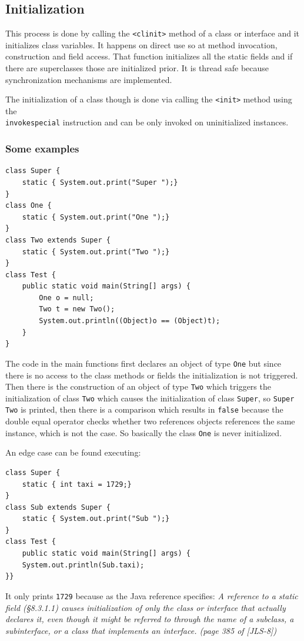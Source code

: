 \subsection{Initialization}
This process is done by calling the \verb|<clinit>| method of a class or interface and it initializes class variables.
It happens on direct use so at method invocation, construction and field access.
That function initializes all the static fields and if there are superclasses those are initialized prior.
It is thread safe because synchronization mechanisms are implemented.

The initialization of a class though is done via calling the \verb|<init>| method using the \\
\verb|invokespecial| instruction and can be only invoked on uninitialized instances.

\subsubsection{Some examples}
\begin{verbatim}
class Super {
    static { System.out.print("Super ");}
}
class One {
    static { System.out.print("One ");}
}
class Two extends Super {
    static { System.out.print("Two ");}
}
class Test {
    public static void main(String[] args) {
        One o = null;
        Two t = new Two();
        System.out.println((Object)o == (Object)t);
    }
}
\end{verbatim}
The code in the main functions first declares an object of type \verb|One| but since there is no access to the class methods or fields the initialization is not triggered.
Then there is the construction of an object of type \verb|Two| which triggers the initialization of class \verb|Two| which causes the initialization of class \verb|Super|, so \verb|Super Two| is printed, then there is a comparison which results in \verb|false| because the double equal operator checks whether two references objects references the same instance, which is not the case.
So basically the class \verb|One| is never initialized.

An edge case can be found executing:
\begin{verbatim}
class Super { 
    static { int taxi = 1729;}
}
class Sub extends Super {
    static { System.out.print("Sub ");}
}
class Test {
    public static void main(String[] args) {
    System.out.println(Sub.taxi);
}}
\end{verbatim}
It only prints \verb|1729| because as the Java reference specifies: \emph{A reference to a static field (§8.3.1.1) causes initialization of only the class or interface that actually declares it, even though it might be referred to through the name of a subclass, a subinterface, or a class that implements an interface. (page 385 of [JLS-8])}

